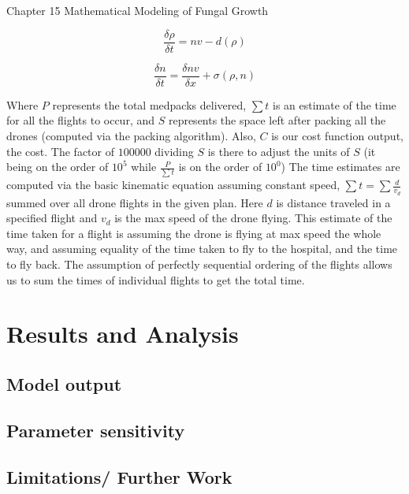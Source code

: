 \documentclass[12pt]{article}
\begin{document}
\begin{multicols}{2}
Chapter 15 Mathematical Modeling of Fungal Growth

\begin{equation}
\frac{\delta\rho}{\delta t}=nv-d(\rho)
\end{equation}

\begin{equation}
\frac{\delta n}{\delta t}=\frac{\delta nv}{\delta x}+\sigma(\rho, n)
\end{equation}


Where $P$ represents the total medpacks delivered, $\sum{t}$ is an estimate of the time for all the flights to occur, and $S$ represents the space left after packing all the drones (computed via the packing algorithm). Also, $C$ is our cost function output, the cost. The factor of $100000$ dividing $S$ is there to adjust the units of $S$ (it being on the order of $10^5$ while $\frac{P}{\sum{t}}$ is on the order of $10^0$) The time estimates are computed via the basic kinematic equation assuming constant speed, $\sum{t}=\sum{\frac{d}{v_d}}$ summed over all drone flights in the given plan. Here $d$ is distance traveled in a specified flight and $v_d$ is the max speed of the drone flying. This estimate of the time taken for a flight is assuming the drone is flying at max speed the whole way, and assuming equality of the time taken to fly to the hospital, and the time to fly back. The assumption of perfectly sequential ordering of the flights allows us to sum the times of individual flights to get the total time.

\section{Results and Analysis}

\subsection{Model output}
\lipsum[6]

\subsection{Parameter sensitivity}
\lipsum[7]




\subsection{Limitations/ Further Work}
\lipsum[8]

\end{multicols}
\printbibliography
\end{document}
